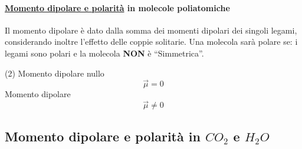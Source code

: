\documentclass{book}
\begin{document}
\paragraph{\underline{Momento dipolare e polarità} in molecole poliatomiche} Il
momento dipolare è dato dalla somma dei momenti dipolari dei singoli legami,
considerando inoltre l'effetto delle coppie solitarie. Una molecola sarà polare
se: i legami sono polari e la molecola \textbf{NON} è ``Simmetrica''.
\begin{tasks}(2)
	\task Momento dipolare nullo
	\begin{equation}
		\vec{\mu}=0
	\end{equation}
	\task Momento dipolare
	\begin{equation}
		\vec{\mu}\neq0
	\end{equation}
\end{tasks}
\subsection{Momento dipolare e polarità in $CO_2$ e $H_2O$}


\printindex
\end{document}
